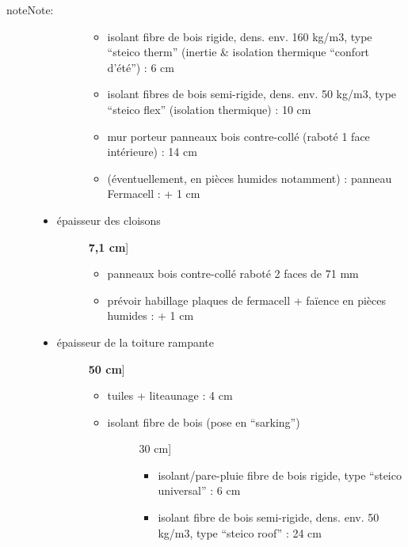 \documentclass[a4paper,12pt,french]{sphinxmanual}
\begin{document}
\begin{notice}{note}{Note:}
\begin{description}
\begin{itemize}
\begin{description}
\begin{itemize}
\item {} 
isolant fibre de bois rigide, dens. env. 160 kg/m3, type ``steico therm'' (inertie \& isolation thermique ``confort d'été'') : 6 cm

\item {} 
isolant fibres de bois semi-rigide, dens. env. 50 kg/m3, type ``steico flex'' (isolation thermique) : 10 cm

\item {} 
mur porteur panneaux bois contre-collé (raboté 1 face intérieure) : 14 cm

\item {} 
(éventuellement, en pièces humides notamment) : panneau Fermacell :  + 1 cm

\end{itemize}

\end{description}

\item {} \begin{description}
\item[{épaisseur des cloisons}] \leavevmode{[}\textbf{7,1 cm}{]}\begin{itemize}
\item {} 
panneaux bois contre-collé raboté 2 faces de 71 mm

\item {} 
prévoir habillage plaques de fermacell + faïence en pièces humides : + 1 cm

\end{itemize}

\end{description}

\item {} \begin{description}
\item[{épaisseur de la toiture rampante}] \leavevmode{[}\textbf{50 cm}{]}\begin{itemize}
\item {} 
tuiles + liteaunage : 4 cm

\item {} \begin{description}
\item[{isolant fibre de bois (pose en ``sarking'')}] \leavevmode{[}30 cm{]}\begin{itemize}
\item {} 
isolant/pare-pluie fibre de bois rigide, type ``steico universal'' : 6 cm

\item {} 
isolant fibre de bois semi-rigide, dens. env. 50 kg/m3, type ``steico roof'' : 24 cm


\end{itemize}
\end{description}
\end{itemize}
\end{description}
\end{itemize}
\end{description}
\end{notice}
\end{document}
